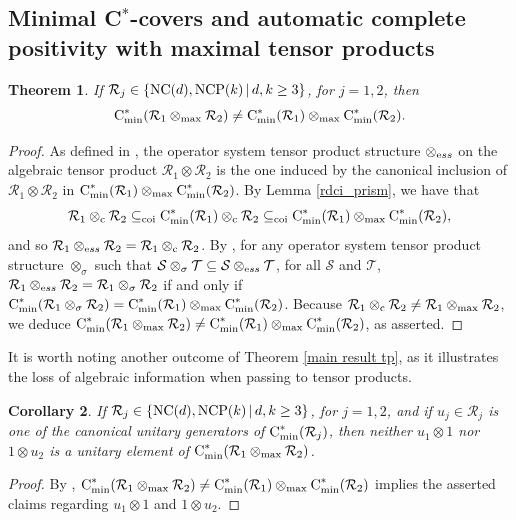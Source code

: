 \documentclass{amsart}
\newtheorem{theorem}{Theorem}[section]
\newtheorem{corollary}[theorem]{Corollary}
\theoremstyle{definition}
\theoremstyle{remark}
\newcommand\osr{{\mathcal R}}
\newcommand\oss{{\mathcal S}}
\newcommand\ost{{\mathcal T}}
\newcommand\omax{\otimes_{\textrm{max}}}
\newcommand\oc{\otimes_{\textrm c}}
\newcommand\cstare{{\textrm C}_{\textrm{min}}^*}              %
\numberwithin{equation}{section}
\begin{document}
  
 \subsection{Minimal C$^*$-covers and automatic complete positivity with maximal tensor products}
  
 \begin{theorem} If $\osr_j\in\{\mbox{\textrm{NC}}(d),\mbox{\textrm{NCP}}(k)\,|\,d,k\geq 3\}$, for $j=1,2$, 
 then
 \[
 \cstare(\osr_1\omax\osr_2) \not= \cstare(\osr_1)\omax\cstare(\osr_2).
 \]
 \end{theorem}
 
 \begin{proof} As defined in \cite{farenick--kavruk--paulsen--todorov2014}, the operator system tensor product structure
 $\otimes_{\textrm ess}$ on the algebraic tensor product $\osr_1\otimes\osr_2$ is the one induced by the canonical inclusion of
 $\osr_1\otimes\osr_2$ in $\cstare(\osr_1)\omax\cstare(\osr_2)$. 
 By Lemma \ref{rdci_prism}, we have that 
 \[
 \osr_1\oc\osr_2\subseteq_{\textrm{coi}}\cstare(\osr_1)\oc\osr_2\subseteq_{\textrm{coi}}\cstare(\osr_1)\omax\cstare(\osr_2),
 \]
 and so $\osr_1\otimes_{\textrm ess}\osr_2=\osr_1\oc\osr_2$. By \cite[Theorem 3.5]{farenick--kavruk--paulsen--todorov2014}, for any operator system
 tensor product structure $\otimes_\sigma$ such that $\oss\otimes_\sigma\ost\subseteq\oss\otimes_{\textrm ess}\ost$, for all $\oss$ and $\ost$,
 $\osr_1\otimes_{\textrm ess}\osr_2=\osr_1\otimes_\sigma\osr_2$ 
  if and only if $\cstare(\osr_1\otimes_\sigma\osr_2) = \cstare(\osr_1)\omax\cstare(\osr_2)$. Because
   $\osr_1\oc\osr_2\not=\osr_1\omax\osr_2$, we deduce $\cstare(\osr_1\omax\osr_2) \not= \cstare(\osr_1)\omax\cstare(\osr_2)$, as asserted.
 \end{proof}
 
 It is worth noting another outcome of Theorem \ref{main result tp}, as it illustrates the loss of algebraic information when passing to tensor products.
 
 \begin{corollary} If
 $\osr_j\in\{\mbox{\textrm{NC}}(d),\mbox{\textrm{NCP}}(k)\,|\,d,k\geq 3\}$, for $j=1,2$, and if $u_j\in\osr_j$ is one of the 
 canonical unitary generators of $\cstare(\osr_j)$, then neither $u_1\otimes 1$ nor $1\otimes u_2$ is a unitary element of
 $\cstare(\osr_1\omax\osr_2)$.
 \end{corollary}
 
 \begin{proof} By \cite[Theorem 3.5]{farenick--kavruk--paulsen--todorov2014}, 
 $ \cstare(\osr_1\omax\osr_2) \not= \cstare(\osr_1)\omax\cstare(\osr_2)$ implies the asserted claims regarding 
 $u_1\otimes 1$ and $1\otimes u_2$.
 \end{proof}
  
\end{document}
